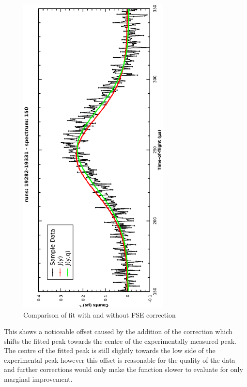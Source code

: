 \documentclass[a4paper]{article}
\begin{document}
\begin{figure}[h!]
  \centering
  \begin{turn}{-90}
    \includegraphics[width=0.68\textwidth]{graphics/mvg_fse_compare.eps}
  \end{turn}
  \vspace{-50pt}
  \caption{Comparison of fit with and without \gls*{FSE} correction}
  \label{fig:mvg_fse_compare}
\end{figure}
\FloatBarrier

This shows a noticeable offset caused by the addition of the correction which
shifts the fitted peak towards the centre of the experimentally measured peak.
The centre of the fitted peak is still slightly towards the low side of the
experimental peak however this offset is reasonable for the quality of the data
and further corrections would only make the function slower to evaluate for only
marginal improvement.
\end{document}
